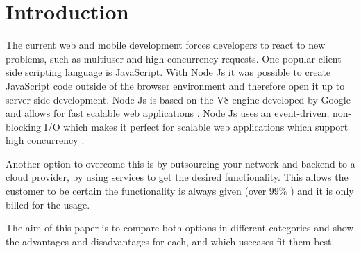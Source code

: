 \section{Introduction}
The current web and mobile development forces developers to react to new problems, such as multiuser and high concurrency requests. One popular client side scripting language is JavaScript. With Node Js it was possible to create JavaScript code outside of the browser environment and therefore open it up to server side development. Node Js is based on the V8 engine developed by Google and allows for fast scalable web applications \cite{NodeJs}. Node Js uses an event-driven, non-blocking I/O which makes it perfect for scalable web applications which support high concurrency \cite{lei2014performance}. 

Another option to overcome this is by outsourcing your network and backend to a cloud provider, by using services to get the desired functionality. This allows the customer to be certain the functionality is always given (over 99\% \cite{FirebaseSLA}) and it is only billed for the usage.

The aim of this paper is to compare both options in different categories and show the advantages and disadvantages for each, and which usecases fit them best.

